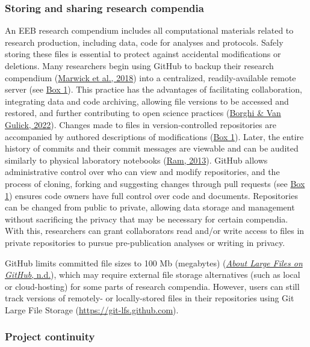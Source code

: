 \hypertarget{storing-sharing}{%
\subsubsection{Storing and sharing research compendia}\label{storing-sharing}}

An EEB research compendium includes all computational materials related to research production, including data, code for analyses and protocols.
Safely storing these files is essential to protect against accidental modifications or deletions.
Many researchers begin using GitHub to backup their research compendium (\protect\hyperlink{ref-MwwMapRG}{Marwick et al., 2018}) into a centralized, readily-available remote server (see \protect\hyperlink{definitions}{Box 1}).
This practice has the advantages of facilitating collaboration, integrating data and code archiving, allowing file versions to be accessed and restored, and further contributing to open science practices (\protect\hyperlink{ref-gLby7jt1}{Borghi \& Van Gulick, 2022}).
Changes made to files in version-controlled repositories are accompanied by authored descriptions of modifications (\protect\hyperlink{definitions}{Box 1}).
Later, the entire history of commits and their commit messages are viewable and can be audited similarly to physical laboratory notebooks (\protect\hyperlink{ref-4ny1onB0}{Ram, 2013}).
GitHub allows administrative control over who can view and modify repositories, and the process of cloning, forking and suggesting changes through pull requests (see \protect\hyperlink{definitions}{Box 1}) ensures code owners have full control over code and documents.
Repositories can be changed from public to private, allowing data storage and management without sacrificing the privacy that may be necessary for certain compendia.
With this, researchers can grant collaborators read and/or write access to files in private repositories to pursue pre-publication analyses or writing in privacy.

GitHub limits committed file sizes to 100 Mb (megabytes) (\protect\hyperlink{ref-1Co6ZZjF1}{\emph{About Large Files on GitHub}, n.d.}), which may require external file storage alternatives (such as local or cloud-hosting) for some parts of research compendia.
However, users can still track versions of remotely- or locally-stored files in their repositories using Git Large File Storage (\url{https://git-lfs.github.com}).

\hypertarget{project-continuity}{%
\subsubsection{Project continuity}\label{project-continuity}}


